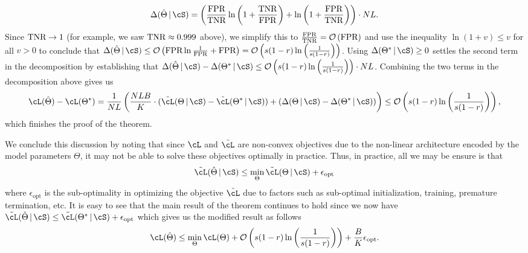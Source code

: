 \[
\Delta(\hat\Theta \cond \cS) = \br{\frac\fnr\tnr\ln\br{1 + \frac\tnr\fnr} + \ln\br{1+\frac\fnr\tnr}}\cdot NL.
\]
Since $\text{TNR} \rightarrow 1$ (for example, we saw $\text{TNR} \approx 0.999$ above), we simplify this to $\frac{\text{FPR}}{\text{TNR}} = {\mathcal O}\left({{\text{FPR}}}\right)$ and use the inequality $\ln(1+v) \leq v$ for all $v > 0$ to conclude that $\Delta(\hat\Theta \cond \cS) \leq \bigO{\fnr\ln\frac1\fnr + \fnr} = \bigO{s(1-r)\ln\br{\frac1{s(1-r)}}}$. Using $\Delta(\Theta^\ast \cond \cS) \geq 0$ settles the second term in the decomposition by establishing that $\Delta(\hat\Theta \cond \cS) - \Delta(\Theta^\ast \cond \cS) \leq \bigO{s(1-r)\ln\br{\frac1{s(1-r)}}}\cdot NL$. Combining the two terms in the decomposition above gives us
\[
\cL(\hat\Theta) - \cL(\Theta^\ast) = \frac1{NL}\br{\frac{NLB}K\cdot(\tilde\cL(\Theta \cond \cS) - \tilde\cL(\Theta^\ast \cond \cS)) + (\Delta(\Theta \cond \cS) - \Delta(\Theta^\ast \cond \cS))} \leq \bigO{s(1-r)\ln\br{\frac1{s(1-r)}}},
\]
which finishes the proof of the theorem.

We conclude this discussion by noting that since $\cL$ and $\tilde\cL$ are non-convex objectives due to the non-linear architecture encoded by the model parameters $\Theta$, it may not be able to solve these objectives optimally in practice. Thus, in practice, all we may be ensure is that
\[
\tilde\cL(\hat\Theta \cond \cS) \leq \min_\Theta \tilde\cL(\Theta \cond \cS) + \epsilon_{\text{opt}}
\]
where $\epsilon_{\text{opt}}$ is the sub-optimality in optimizing the objective $\tilde\cL$ due to factors such as sub-optimal initialization, training, premature termination, etc. It is easy to see that the main result of the theorem continues to hold since we now have $\tilde\cL(\hat\Theta \cond \cS) \leq \tilde\cL(\Theta^\ast \cond \cS) + \epsilon_{\text{opt}}$ which gives us the modified result as follows
\[
\cL(\hat\Theta) \leq \min_\Theta \cL(\Theta) + \bigO{s(1-r)\ln\br{\frac1{s(1-r)}}} + \frac BK\epsilon_{\text{opt}}.
\]
